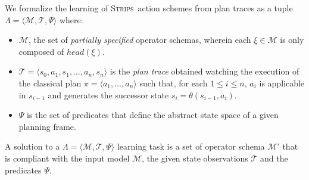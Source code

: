 \documentclass[letterpaper]{article} %
\newcommand{\tup}[1]{{\langle #1 \rangle}}
\newcommand{\strips}{\textsc{Strips}}     %
\begin{document}
We formalize the learning of \strips\ action schemes from plan traces as a tuple $\Lambda=\tup{\mathcal{M},\mathcal{T},\Psi}$ where:
\begin{itemize}
\item $\mathcal{M}$, the set of {\em partially specified} operator schemas, wherein each $\xi\in\mathcal{M}$ is only composed of $head(\xi)$.
\item $\mathcal{T}=\tup{s_0,a_1,s_1,\ldots,a_n,s_{n}}$ is the {\em plan trace} obtained watching the execution of the classical plan $\pi=\tup{a_1, \ldots, a_n}$ such that, for each {\small $1\leq i\leq n$}, $a_i$ is applicable in $s_{i-1}$ and generates the successor state $s_i=\theta(s_{i-1},a_i)$. 
\item $\Psi$ is the set of predicates that define the abstract state space of a given planning frame. 
\end{itemize}

A solution to a $\Lambda=\tup{\mathcal{M},\mathcal{T},\Psi}$ learning task is a set of operator schema $\mathcal{M}'$ that is compliant with the input model $\mathcal{M}$, the given state observations $\mathcal{T}$ and the predicates $\Psi$. 
\end{document}

